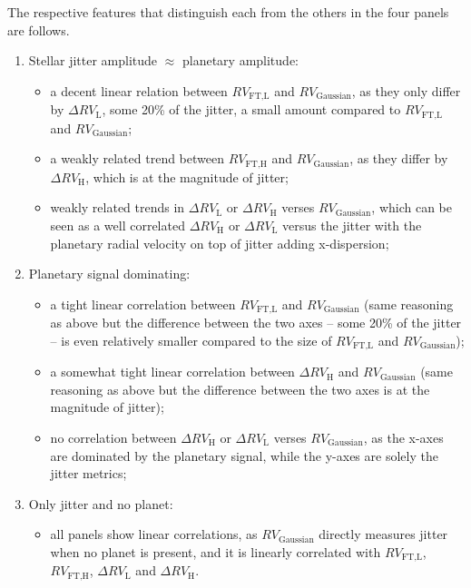 The respective features that distinguish each from the others in the four panels are follows.
\begin{enumerate}[label=(\alph*)]
	\item Stellar jitter amplitude $\approx$ planetary amplitude:
	\begin{itemize}
		\item a decent linear relation between $RV_\text{FT,L}$ and $RV_\text{Gaussian}$, as they only differ by $\Delta RV_\text{L}$, some 20\% of the jitter, a small amount compared to $RV_\text{FT,L}$ and $RV_\text{Gaussian}$;
		\item a weakly related trend between $RV_\text{FT,H}$ and $RV_\text{Gaussian}$, as they differ by $\Delta RV_\text{H}$, which is at the magnitude of jitter;
		\item weakly related trends in $\Delta RV_\text{L}$ or $\Delta RV_\text{H}$ verses $RV_\text{Gaussian}$, which can be seen as a well correlated $\Delta RV_\text{H}$ or $\Delta RV_\text{L}$ versus the jitter with the planetary radial velocity on top of jitter adding x-dispersion;
	\end{itemize}
	
	\item Planetary signal dominating:
	\begin{itemize}
		\item a tight linear correlation between $RV_\text{FT,L}$ and $RV_\text{Gaussian}$ (same reasoning as above but the difference between the two axes -- some 20\% of the jitter -- is even relatively smaller compared to the size of $RV_\text{FT,L}$ and $RV_\text{Gaussian}$);
		\item a somewhat tight linear correlation between $\Delta RV_\text{H}$ and $RV_\text{Gaussian}$ (same reasoning as above but the difference between the two axes is at the magnitude of jitter);
		\item no correlation between $\Delta RV_\text{H}$ or $\Delta RV_\text{L}$ verses $RV_\text{Gaussian}$, as the x-axes are dominated by the planetary signal, while the y-axes are solely the jitter metrics;
	\end{itemize}
	
	\item Only jitter and no planet:
	\begin{itemize}
		\item all panels show linear correlations, as $RV_\text{Gaussian}$ directly measures jitter when no planet is present, and it is linearly correlated with $RV_\text{FT,L}$, $RV_\text{FT,H}$, $\Delta RV_\text{L}$ and $\Delta RV_\text{H}$. 
	\end{itemize}


\end{enumerate}
